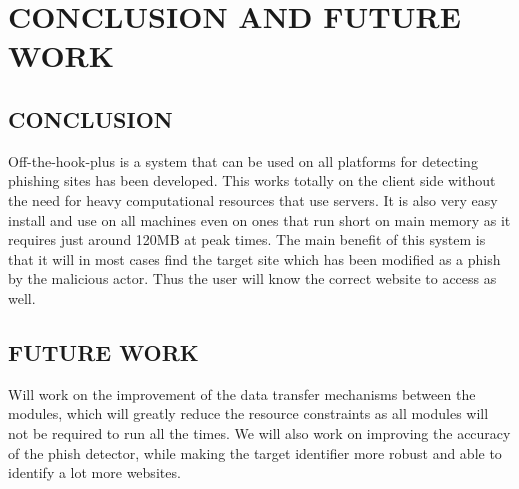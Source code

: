 
\chapter{CONCLUSION AND FUTURE WORK} %
\section{CONCLUSION}
Off-the-hook-plus is a system that can be used on all platforms for detecting phishing sites has been developed. This works totally on the client side without the need for heavy computational resources that use servers. It is also very easy install and use on all machines even on ones that run short on main memory as it requires just around 120MB at peak times. The main benefit of this system is that it will in most cases find the target site which has been modified as a phish by the malicious actor. Thus the user will know the correct website to access as well.

\section{FUTURE WORK}
Will work on the improvement of the data transfer mechanisms between the modules, which will greatly reduce the resource constraints as all modules will not be required to run all the times. We will also work on improving the accuracy of the phish detector, while making the target identifier more robust and able to identify a lot more websites.